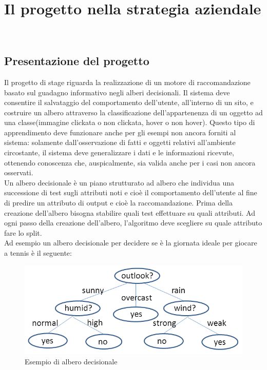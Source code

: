 
\chapter{Il progetto nella strategia aziendale}
\label{cap:processi-metodologie}

\\

\section{Presentazione del progetto}
Il progetto di stage riguarda la realizzazione di un motore di raccomandazione basato sul guadagno informativo negli alberi decisionali. Il sistema deve consentire il salvataggio del comportamento dell'utente, all'interno di un sito, e costruire un albero attraverso la classificazione dell'appartenenza di un oggetto ad una classe(immagine clickata o non clickata, hover o non hover). Questo tipo di apprendimento deve funzionare anche per gli esempi non ancora forniti al sistema: solamente dall'osservazione di fatti e oggetti relativi all'ambiente circostante, il sistema deve generalizzare i dati e le informazioni ricevute, ottenendo conoscenza che, auspicalmente, sia valida anche per i casi non ancora osservati.\\
Un albero decisionale è un piano strutturato ad albero che individua una successione di test sugli attributi noti e cioè il comportamento dell'utente al fine di predire un attributo  di output e cioè la raccomandazione. Prima della creazione dell'albero bisogna stabilire quali test effettuare su quali attributi. Ad ogni passo della creazione dell'albero, l'algoritmo deve scegliere su quale attributo fare lo split.\\
Ad esempio un albero decisionale per decidere  se è la giornata ideale per giocare a tennis è il seguente:
\begin{figure}[h]
\centering
\includegraphics[width=0.7\linewidth]{immagini/play}
\caption[Esempio di albero decisionale]{Esempio di albero decisionale}
\label{fig:albero-decisionale-esempio}
\end{figure}

